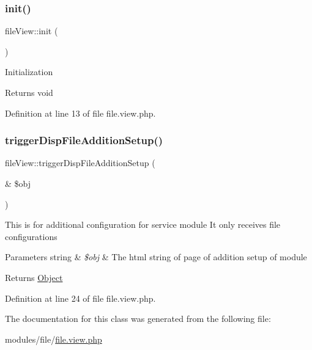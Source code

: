 \subsubsection{\texorpdfstring{init()}{init()}}
{\footnotesize\ttfamily file\+View\+::init (\begin{DoxyParamCaption}{ }\end{DoxyParamCaption})}

Initialization \begin{DoxyReturn}{Returns}
void 
\end{DoxyReturn}


Definition at line 13 of file file.\+view.\+php.

\hypertarget{classfileView_a7df980966b9a93c9416959ba21c14c55}{}\label{classfileView_a7df980966b9a93c9416959ba21c14c55} 
\subsubsection{\texorpdfstring{trigger\+Disp\+File\+Addition\+Setup()}{triggerDispFileAdditionSetup()}}
{\footnotesize\ttfamily file\+View\+::trigger\+Disp\+File\+Addition\+Setup (\begin{DoxyParamCaption}\item[{\&}]{\$obj }\end{DoxyParamCaption})}

This is for additional configuration for service module It only receives file configurations


\begin{DoxyParams}[1]{Parameters}
string & {\em \$obj} & The html string of page of addition setup of module \\
\hline
\end{DoxyParams}
\begin{DoxyReturn}{Returns}
\hyperlink{classObject}{Object} 
\end{DoxyReturn}


Definition at line 24 of file file.\+view.\+php.



The documentation for this class was generated from the following file\+:\begin{DoxyCompactItemize}
\item 
modules/file/\hyperlink{file_8view_8php}{file.\+view.\+php}\end{DoxyCompactItemize}

